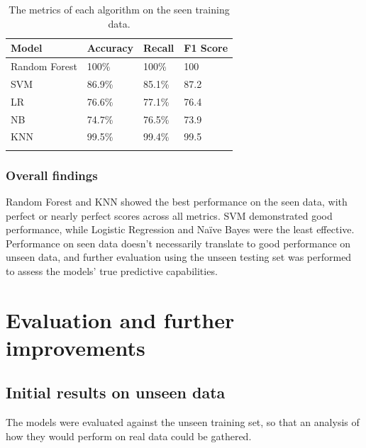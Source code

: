 \documentclass[12pt]{report}
\begin{document}

\begin{longtable}{ | p{} | p{} | p{} | p{} | }
    \hline
    \cellcolor{blue!25} Model & \cellcolor{blue!25} Accuracy & \cellcolor{blue!25} Recall & \cellcolor{blue!25} F1 Score\\
    \hline
    Random Forest & 100\% & 100\% & 100\\ 
    \hline
    SVM & 86.9\% & 85.1\% & 87.2 \\
    \hline
    LR & 76.6\% & 77.1\% & 76.4\\
    \hline
    NB & 74.7\% & 76.5\% & 73.9\\
    \hline
    KNN & 99.5\% & 99.4\% & 99.5 \\
    \hline
    \caption{The metrics of each algorithm on the seen training data.}\label{tab:Iteration1Training}
\end{longtable}

\subsection{Overall findings}
Random Forest and KNN showed the best performance on the seen data, with perfect or nearly perfect scores across all metrics. 
SVM demonstrated good performance, while Logistic Regression and Naïve Bayes were the least effective. 
Performance on seen data doesn't necessarily translate to good performance on unseen data, and further
evaluation using the unseen testing set was performed to assess the models' true predictive capabilities.


\chapter{Evaluation and further improvements}

\section{Initial results on unseen data}
The models were evaluated against the unseen training set, so that an analysis 
of how they would perform on real data could be gathered.
\end{document}
